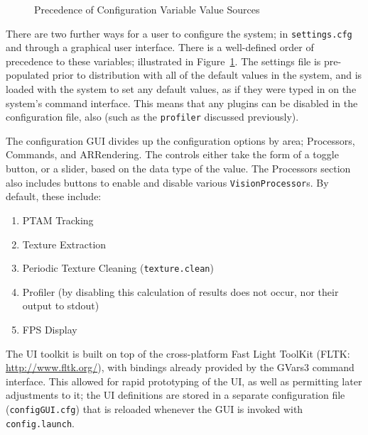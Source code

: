 \documentclass[a4paper,10pt]{article}
\begin{document}
\begin{figure}[h]
  \begin{center}
  \end{center}
  \caption{Precedence of Configuration Variable Value Sources}
  \label{configprecedence}
\end{figure}

There are two further ways for a user to configure the system; in \texttt{settings.cfg} and through a graphical user interface. There is a well-defined order of precedence to these variables; illustrated in Figure~\ref{configprecedence}. The settings file is pre-populated prior to distribution with all of the default values in the system, and is loaded with the system to set any default values, as if they were typed in on the system's command interface. This means that any plugins can be disabled in the configuration file, also (such as the \texttt{profiler} discussed previously).

The configuration GUI divides up the configuration options by area; Processors, Commands, and ARRendering. The controls either take the form of a toggle button, or a slider, based on the data type of the value. The Processors section also includes buttons to enable and disable various \texttt{VisionProcessor}s. By default, these include:

\begin{enumerate}
\item{PTAM Tracking}
\item{Texture Extraction}
\item{Periodic Texture Cleaning (\texttt{texture.clean})}
\item{Profiler (by disabling this calculation of results does not occur, nor their output to stdout)}
\item{FPS Display}
\end{enumerate}

The UI toolkit is built on top of the cross-platform Fast Light ToolKit (FLTK: \url{http://www.fltk.org/}), with bindings already provided by the GVars3 command interface. This allowed for rapid prototyping of the UI, as well as permitting later adjustments to it; the UI definitions are stored in a separate configuration file (\texttt{configGUI.cfg}) that is reloaded whenever the GUI is invoked with \texttt{config.launch}.
\end{document}
